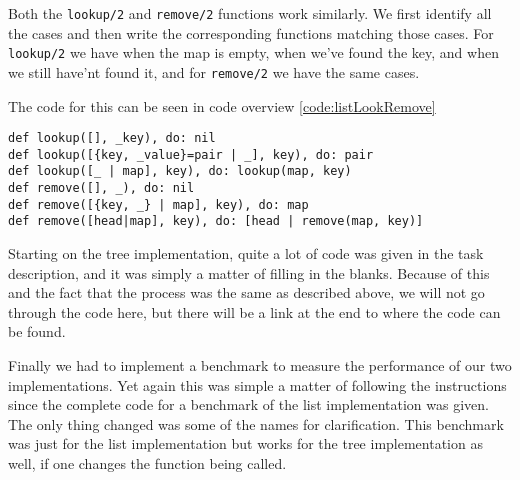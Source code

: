 \documentclass[a4paper,11pt]{article}
\newenvironment{code}{\captionsetup{type=listing}}{}
\begin{document}
Both the {\tt lookup/2} and {\tt remove/2} functions work similarly. We first identify all the cases and then write the corresponding functions matching
those cases.
For {\tt lookup/2} we have when the map is empty, when we've found the key, and when we still have'nt found it, and for {\tt remove/2} we have the same
cases.

The code for this can be seen in code overview \ref{code:listLookRemove}
\begin{code}
    \label{code:listLookRemove}
    \begin{verbatim}
def lookup([], _key), do: nil
def lookup([{key, _value}=pair | _], key), do: pair
def lookup([_ | map], key), do: lookup(map, key)
def remove([], _), do: nil
def remove([{key, _} | map], key), do: map
def remove([head|map], key), do: [head | remove(map, key)]
\end{verbatim}
\end{code}

Starting on the tree implementation, quite a lot of code was given in the task description, and it was simply a matter of filling in the blanks.
Because of this and the fact that the process was the same as described above, we will not go through the code here, but there will be a link at the
end to where the code can be found.

Finally we had to implement a benchmark to measure the performance of our two implementations. Yet again this was simple a matter of following the
instructions since the complete code for a benchmark of the list implementation was given. The only thing changed was some of the names for
clarification. This benchmark was just for the list implementation but works for the tree implementation as well, if one changes the function being
called.
\end{document}
